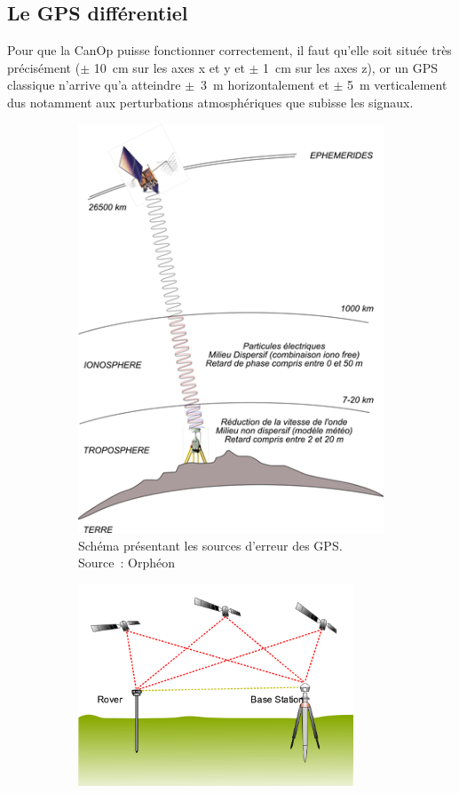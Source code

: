 \subsection{Le GPS différentiel}
\label{ssec_Gps_differenciel}
Pour que la CanOp puisse fonctionner correctement, il faut qu'elle soit située très précisément ($\pm$ 10~cm sur les axes x et y et $\pm$ 1~cm sur les axes z), or un GPS classique n'arrive qu’a atteindre $\pm$~3~m horizontalement et $\pm$ 5~m verticalement \cite{} dus notamment aux perturbations atmosphériques que subisse les signaux. 
\begin{figure}
    
    \begin{subfigure}[t]{0.5\textwidth}
        \centering
        \includegraphics[height=0.9\textwidth]{img/she/GPS-mode-Naturel-5-10m.png}
        
        \caption[Source d'erreur des GPS]{Schéma présentant les sources d'erreur des GPS. Source~: Orphéon}
        \label{fig_GPS_error_source}
    \end{subfigure}
    \begin{subfigure}[t]{0.5\textwidth}
        \centering
        \includegraphics[width=0.9\textwidth]{img/she/Real_time_kinematic.png}
        

\end{subfigure}
\end{figure}
